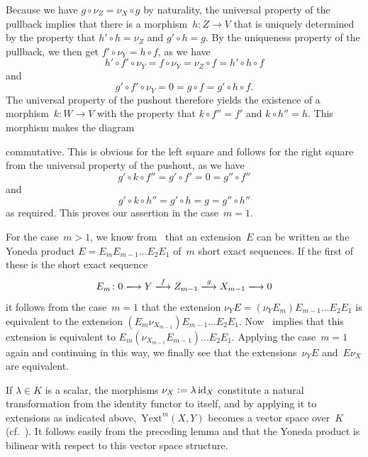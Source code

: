 \documentclass[12pt]{article}
\makeatletter
\theoremstyle{definition}
\theoremstyle{break}
\renewenvironment{proof}[1][\proofname]{\par
\vspace{-5pt}%
\pushQED{\qed}%
\normalfont
\topsep0pt \partopsep0pt %
\trivlist
\item[\hskip\labelsep
\bfseries
#1\@addpunct{.}]\ignorespaces
}{%
\popQED\endtrivlist\@endpefalse
\addvspace{6pt plus 6pt} %
}
\DeclareMathOperator\id{id}
\newcommand{\Yext}{\mathrm{Yext}}
\renewcommand{\1}{\mathbbm{1}}
\newcommand{\deq}{\vcentcolon =}
\makeatother
\begin{document}
\begin{proof}
Because we have $g \circ \nu_Z = \nu_X \circ g$ by naturality, the universal property of the pullback implies that there is a morphism~\mbox{$h \colon Z \to V$} that is uniquely determined by the property that
$h' \circ h = \nu_Z$ and $g' \circ h = g$. By the uniqueness property of the pullback, we then get $f' \circ \nu_Y = h \circ f$, as we have
\[h' \circ f' \circ \nu_Y = f \circ \nu_Y = \nu_Z \circ f = h' \circ h \circ f\]
and
\[g' \circ f' \circ \nu_Y = 0 = g \circ f = g' \circ h \circ f.\]
The universal property of the pushout therefore yields the existence of a morphism~\mbox{$k \colon W \to V$} with the property that $k \circ f'' = f'$ and $k \circ h'' = h$. This morphism makes the diagram
\begin{center}
\end{center}
commutative. This is obvious for the left square and follows for the right square from the universal property of the pushout, as we have
\[g' \circ k \circ f'' = g' \circ f' = 0 = g'' \circ f''\]
and
\[g' \circ k \circ h'' = g' \circ h = g = g'' \circ h''\]
as required. This proves our assertion in the case~$m=1$.

For the case~$m>1$, we know from~\cite[p.~171]{Mi} that an extension~$E$ can be written as the Yoneda product $E = E_m E_{m-1} \dots E_2 E_1$ of~$m$ short exact sequences. If the first of these is the short exact sequence
\[E_m \colon 0 \xlongrightarrow{} Y \xlongrightarrow{f} Z_{m-1} \xlongrightarrow{g} X_{m-1}
\xlongrightarrow{} 0\]
it follows from the case~$m=1$ that the extension $\nu_Y E = (\nu_Y E_m) E_{m-1} \dots E_2 E_1$ is equivalent to the extension $(E_m \nu_{X_{m-1}}) E_{m-1} \dots E_2 E_1$. Now~\cite[Chap.~VII, \S~3, Eq.~(3), p.~171]{Mi} implies that this extension is equivalent to
$E_m (\nu_{X_{m-1}} E_{m-1}) \dots E_2 E_1$. Applying the case~$m=1$ again and continuing in this way, we finally see that the extensions~$\nu_Y E$ and~$E \nu_X$ are equivalent.
\end{proof}

If $\lambda \in K$ is a scalar, the morphisms $\nu_X \deq \lambda \id_X$ constitute a natural transformation from the identity functor to itself, and by applying it to extensions as indicated above,~$\Yext^m(X,Y)$ becomes a vector space over~$K$ (cf.~\cite[Sec.~5.1, p.~68]{He}). It follows easily from the preceding lemma and \cite[Chap.~VII, Lem.~3.2, p.~173]{Mi} that the Yoneda product is bilinear with respect to this vector space structure.
\end{document}
